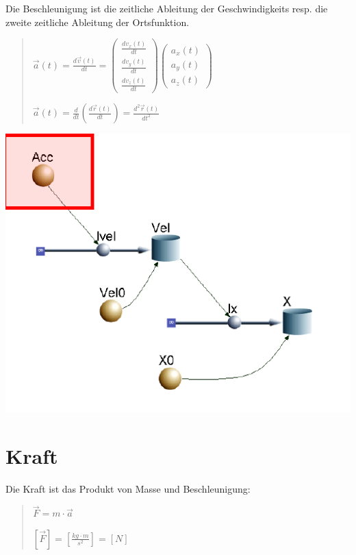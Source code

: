 Die Beschleunigung ist die zeitliche Ableitung der Geschwindigkeits
resp. die zweite zeitliche Ableitung der Ortsfunktion.
\begin{verse}
$\vec{a}(t)=\frac{d\vec{v}(t)}{dt}=\left(\begin{array}{c}
\frac{dv_{x}(t)}{dt}\\
\frac{dv_{y}(t)}{dt}\\
\frac{dv_{z}(t)}{dt}
\end{array}\right)\left(\begin{array}{c}
a_{x}(t)\\
a_{y}(t)\\
a_{z}(t)
\end{array}\right)$

$\vec{a}(t)=\frac{d}{dt}\left(\frac{d\vec{r}(t)}{dt}\right)=\frac{d^{2}\vec{r}(t)}{dt^{2}}$
\end{verse}
\includegraphics[scale=0.6]{Kinetik/BM}


\section*{Kraft}

Die Kraft ist das Produkt von Masse und Beschleunigung:
\begin{verse}
$\vec{F}=m\cdot\vec{a}$

$\left[\vec{F}\right]=\left[\frac{kg\cdot m}{s^{2}}\right]=\left[N\right]$
\end{verse}

